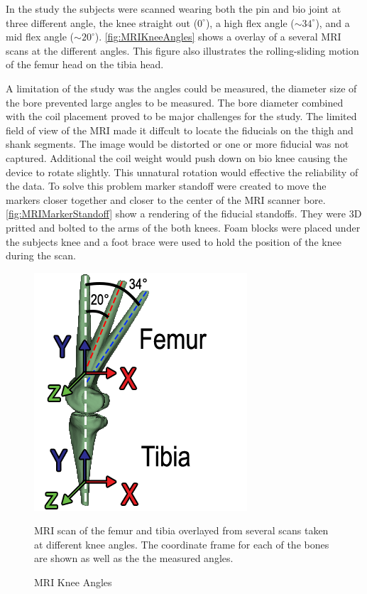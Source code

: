 In the study the subjects were scanned wearing both the pin and bio joint at three different angle, the knee straight out ($0^{\circ}$), a high flex angle ($\sim34^{\circ}$),  and a mid flex angle  ($\sim20^{\circ}$). \autoref{fig:MRIKneeAngles} shows a overlay of a several MRI scans at the different angles. This figure also illustrates the rolling-sliding motion of the femur head on the tibia head. 

A limitation of the study was the angles could be measured, the diameter size of the bore prevented large angles to be measured. The bore diameter combined with the coil placement proved to be major challenges for the study. The limited field of view of the MRI made it diffcult to locate the fiducials on the thigh and shank segments. The image would be distorted or one or more fiducial was not captured. Additional the coil weight would push down on bio knee causing the device to rotate slightly. This unnatural rotation would effective the reliability of the data. To solve this problem marker standoff were created to move the markers closer together and closer to the center of the MRI scanner bore. \autoref{fig:MRIMarkerStandoff} show a rendering of the fiducial standoffs. They were 3D pritted and bolted to the arms of the both knees. Foam blocks were placed under the subjects knee and a foot brace were used to hold the position of the knee during the scan. 


\begin{figure}
    \centering
    \includegraphics{images/mech_design/mri_knee_angles.png}
    \caption{MRI Knee Angles}{MRI scan of the femur and tibia overlayed from several scans taken at different knee angles. The coordinate frame for each of the bones are shown as well as the the measured angles.}
    \label{fig:MRIKneeAngles}
\end{figure}


